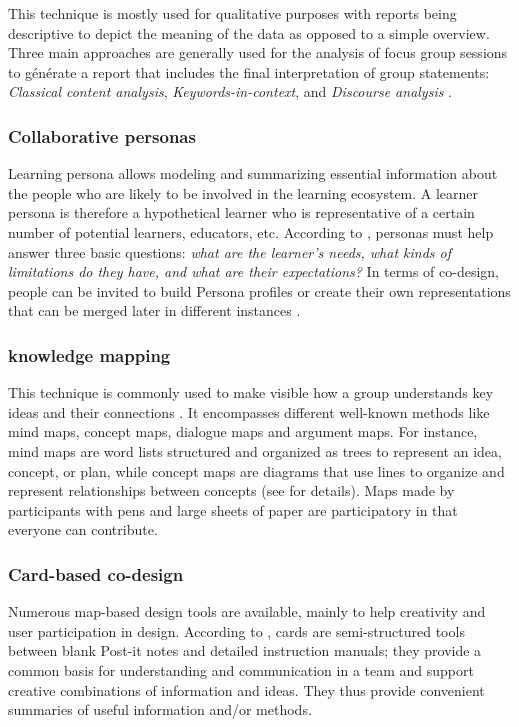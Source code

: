 \documentclass[manuscript,nonacm,12pt]{acmart}
\begin{document}
This technique is mostly used for qualitative purposes with reports being descriptive to depict the meaning of the data as opposed to a simple overview. Three main approaches are generally used for the analysis of focus group sessions to générate a report that includes the final interpretation of group
statements: \textit{Classical content analysis}, \textit{Keywords-in-context}, and \textit{Discourse analysis} \cite{prieto2018co}.



\subsubsection{Collaborative personas}
Learning persona allows modeling and summarizing essential information about the people who are likely to be involved in the learning ecosystem. A learner persona is therefore a hypothetical learner who is representative of a certain number of potential learners, educators, etc.
According to \citet{zhang2016data}, personas must help answer three basic questions: \textit{what are the learner’s needs, what kinds of limitations do they have, and what are their expectations?}
In terms of co-design, people can be invited to build Persona profiles or create their own representations that can be merged later in different instances \cite{prieto2018co}.

\subsubsection{knowledge mapping}
This technique is commonly used to make visible how a group understands key ideas and their connections \cite{prieto2018co}. It encompasses different well-known methods like  mind maps, concept
maps, dialogue maps and argument maps. For instance, mind maps are word lists structured and organized as trees to represent an idea, concept, or plan, while concept maps are diagrams that use lines to organize and represent relationships between concepts \cite{carrillo2017dashboard} (see \cite{okada2008knowledge} for details). Maps made by participants with pens and large sheets of paper are participatory in that everyone can contribute.

\subsubsection{Card-based co-design}
Numerous map-based design tools are available, mainly to help creativity and user participation in design. According to \citet{roy2019card}, cards are semi-structured tools between blank Post-it notes and detailed instruction manuals; they provide a common basis for understanding and communication in a team and support creative combinations of information and ideas. They thus  provide convenient summaries of useful information and/or methods.
\end{document}
